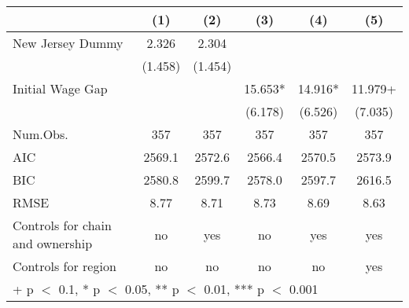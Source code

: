 \begin{table}
\centering
\begin{tabular}[t]{lccccc}
\toprule
  & (1) & (2) & (3) & (4) & (5)\\
\midrule
New Jersey Dummy & \num{2.326} & \num{2.304} &  &  & \\
 & (\num{1.458}) & (\num{1.454}) &  &  & \\
Initial Wage Gap &  &  & \num{15.653}* & \num{14.916}* & \num{11.979}+\\
 &  &  & (\num{6.178}) & (\num{6.526}) & (\num{7.035})\\
\midrule
Num.Obs. & \num{357} & \num{357} & \num{357} & \num{357} & \num{357}\\
AIC & \num{2569.1} & \num{2572.6} & \num{2566.4} & \num{2570.5} & \num{2573.9}\\
BIC & \num{2580.8} & \num{2599.7} & \num{2578.0} & \num{2597.7} & \num{2616.5}\\
RMSE & \num{8.77} & \num{8.71} & \num{8.73} & \num{8.69} & \num{8.63}\\
Controls for chain and ownership & no & yes & no & yes & yes\\
Controls for region & no & no & no & no & yes\\
\bottomrule
\multicolumn{6}{l}{\rule{0pt}{1em}+ p $<$ 0.1, * p $<$ 0.05, ** p $<$ 0.01, *** p $<$ 0.001}\\
\end{tabular}
\end{table}
